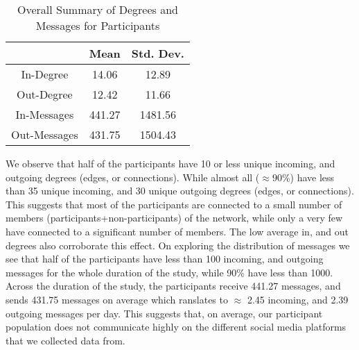 \begin{table}[h]
\centering
\caption{Overall Summary of Degrees and Messages for Participants}
\begin{tabular}{| c | c | c |}
\hline
 & \textbf{Mean} & \textbf{Std. Dev.}\\
\hline
In-Degree & 14.06 & 12.89\\
\hline
Out-Degree & 12.42 & 11.66\\
\hline
In-Messages & 441.27 & 1481.56\\
\hline
Out-Messages & 431.75 & 1504.43\\
\hline
\end{tabular}
\label{table:degMsgMeanStd}
\end{table}

We observe that half of the participants have 10 or less unique incoming, and outgoing degrees (edges, or connections). 
While almost all ($\approx 90\%$) have less than 35 unique incoming, and 30 unique outgoing degrees (edges, or connections). 
This suggests that most of the participants are connected to a small number of members (participants+non-participants) of the network, while only a very few have connected to a significant number of members. 
The low average in, and out degrees also corroborate this effect. 
On exploring the distribution of messages we see that half of the participants have less than 100 incoming, and outgoing messages for the whole duration of the study, while 90\% have less than 1000. 
Across the duration of the study, the participants receive 441.27 messages, and sends 431.75 messages on average which ranslates to $\approx$ 2.45 incoming, and 2.39 outgoing messages per day. 
This suggests that, on average, our participant population does not communicate highly on the different social media platforms that we collected data from.